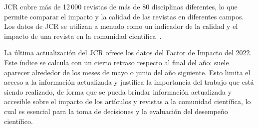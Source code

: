 JCR cubre más de 12\,000 revistas de más de 80 disciplinas diferentes, lo que permite comparar el impacto y la calidad de las revistas en diferentes campos. Los datos de JCR se utilizan a menudo como un indicador de la calidad y el impacto de una revista en la comunidad científica~\cite{clarivate2019}.

La última actualización del JCR ofrece los datos del Factor de Impacto del 2022. Este índice se calcula con un cierto retraso respecto al final del año: suele aparecer alrededor de los meses de mayo o junio del año siguiente. Esto limita el acceso a la información actualizada y justifica la importancia del trabajo que está siendo realizado, de forma que se pueda brindar información actualizada y accesible sobre el impacto de los artículos y revistas a la comunidad científica, lo cual es esencial para la toma de decisiones y la evaluación del desempeño científico.